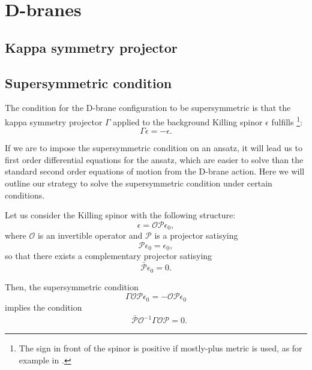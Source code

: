 \section{D-branes}\label{sec:Dbranes}


\subsection{Kappa symmetry projector}



\subsection{Supersymmetric condition}
The condition for the D-brane configuration to be supersymmetric is that the kappa symmetry projector $\Gamma$ applied to the background Killing spinor $\epsilon$ fulfills
\footnote{The sign in front of the spinor is positive if mostly-plus metric is used, as for example in \cite{Skenderis:2002vf}.}:
\begin{equation} \label{eq:susyCondition}
 \Gamma \epsilon = - \epsilon.
\end{equation}

If we are to impose the supersymmetric condition on an ansatz, it will lead us to first order differential equations for the ansatz, which are easier to solve than the standard second order equations of motion from the D-brane action. Here we will outline our strategy to solve the supersymmetric condition under certain conditions.

Let us consider the Killing spinor with the following structure:
\begin{equation}
\epsilon = \mathcal{O} \mathcal{P} \epsilon_0,
\end{equation}
where $\mathcal{O}$ is an invertible operator and $\mathcal{P}$ is a projector satisying
\begin{equation}
    \mathcal{P} \epsilon_0 =  \epsilon_0,
\end{equation}
so that there exists a complementary projector satisying
\begin{equation}
    \bar{\mathcal{P}} \epsilon_0 =  0.
\end{equation}

Then, the supersymmetric condition
\begin{equation}
 \Gamma \mathcal{O} \mathcal{P} \epsilon_0 = - \mathcal{O} \mathcal{P} \epsilon_0
\end{equation}
implies the condition
\begin{align}\label{eq:susyCondition0}
&\bar{\mathcal{P}} \mathcal{O}^{-1} \Gamma \mathcal{O} \mathcal{P}  = 0.
\end{align}


